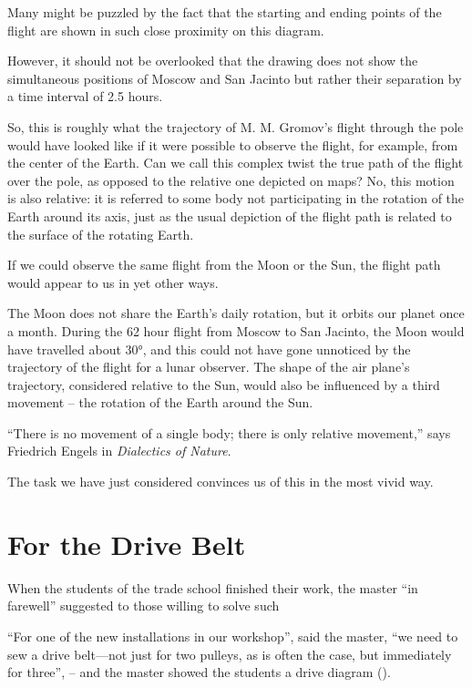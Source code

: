 Many might be puzzled by the fact that the starting and ending points of the flight are shown in such close proximity on this diagram.

However, it should not be overlooked that the drawing does not show the simultaneous positions of Moscow and San Jacinto but rather their separation by a time interval of 2.5 hours.

So, this is roughly what the trajectory of M. M. Gromov's flight through the pole would have looked like if it were possible to observe the flight, for example, from the center of the Earth. Can we call this complex twist the true path of the flight over the pole, as opposed to the relative one depicted on maps? No, this motion is also relative: it is referred to some body not participating in the rotation of the Earth around its axis, just as the usual depiction of the flight path is related to the surface of the rotating Earth.

If we could observe the same flight from the Moon or the Sun, the flight path would appear to us in yet other ways.

The Moon does not share the Earth's daily rotation, but it orbits our planet once a month. During the 62 hour flight from Moscow to San Jacinto, the Moon would have travelled about \ang{30}, and this could not have gone unnoticed by the trajectory of the flight for a lunar observer. The shape of the air plane's trajectory, considered relative to the Sun, would also be influenced by a third movement -- the rotation of the Earth around the Sun.

``There is no movement of a single body; there is only relative movement,'' says Friedrich Engels in \emph{Dialectics of Nature}.

The task we have just considered convinces us of this in the most vivid way.

\clearpage

\section{For the Drive Belt}
\label{sec-9.13}

When the students of the trade school finished their work, the master ``in farewell'' suggested to those willing to solve such

\ques ``For one of the new installations in our workshop'', said the master, ``we need to sew a drive belt—not just for two pulleys, as is often the case, but immediately for three'', -- and the master showed the students a drive diagram ().

